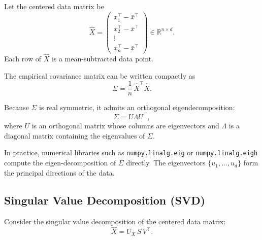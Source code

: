 \documentclass[../main]{subfiles}
\begin{document}
    \begin{definition}
        Let the centered data matrix be
        \begin{equation}
            \hat{X}
            =
            \begin{pmatrix}
                x_1^{\top} - \bar{x}^{\top} \\
                x_2^{\top} - \bar{x}^{\top} \\
                \vdots \\
                x_n^{\top} - \bar{x}^{\top}
            \end{pmatrix}
            \in \mathbb{R}^{n \times d}.
        \end{equation}
        Each row of $\hat{X}$ is a mean-subtracted data point.
        \end{definition}
        
        The empirical covariance matrix can be written compactly as
        \begin{equation}
            \Sigma = \frac{1}{n}\, \hat{X}^{\top}\hat{X}.
        \end{equation}
        
        \begin{theorem}
        Because $\Sigma$ is real symmetric, it admits an orthogonal eigendecomposition:
        \begin{equation}
            \Sigma
            = U \Lambda U^{\top},
        \end{equation}
        where $U$ is an orthogonal matrix whose columns are eigenvectors  
        and $\Lambda$ is a diagonal matrix containing the eigenvalues of $\Sigma$.
        \end{theorem}
        
        In practice, numerical libraries such as \texttt{numpy.linalg.eig} or 
        \texttt{numpy.linalg.eigh} compute the eigen-decomposition of $\Sigma$ directly.  
        The eigenvectors $\{u_1,\ldots,u_d\}$ form the principal directions of the data.
\subsection{Singular Value Decomposition (SVD)}
        Consider the singular value decomposition of the centered data matrix:
        \begin{equation}
            \hat{X} = U_X\, S\, V^{\top}.
        \end{equation}
        \newcommand{\mblock}[2]{%
  \begingroup
  \setlength{\fboxsep}{1pt}%
  \colorbox{#1!20}{$\displaystyle #2$}%
  \endgroup
}
\end{document}
